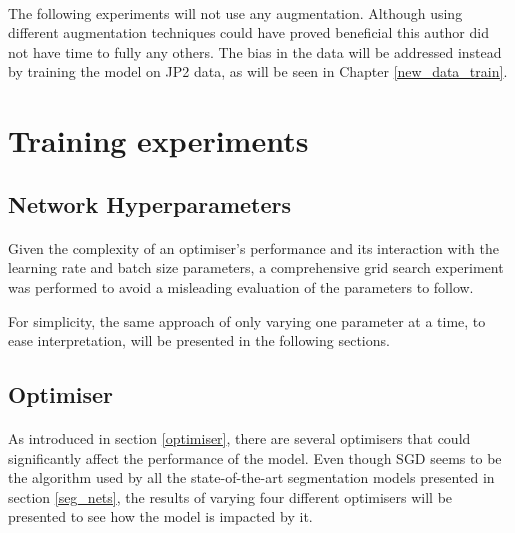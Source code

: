 \paragraph{}
 The following experiments will not use any augmentation. Although using different augmentation techniques could have proved beneficial this author did not have time to fully any others. The bias in the data will be addressed instead by training the model on \gls{JP2} data, as will be seen in Chapter \ref{new_data_train}.

\section{Training experiments}
\subsection{Network Hyperparameters}
\paragraph{}
Given the complexity of an optimiser's performance and its interaction with the learning rate and batch size parameters, a comprehensive grid search experiment was performed to avoid a misleading evaluation of the parameters to follow.

For simplicity, the same approach of only varying one parameter at a time, to ease interpretation, will be presented in the following sections.

\subsection{Optimiser}
\paragraph{}
As introduced in section \ref{optimiser}, there are several optimisers that could significantly affect the performance of the model. Even though \gls{SGD} seems to be the algorithm used by all the state-of-the-art segmentation models presented in section \ref{seg_nets}, the results of varying four different optimisers will be presented to see how the model is impacted by it.

